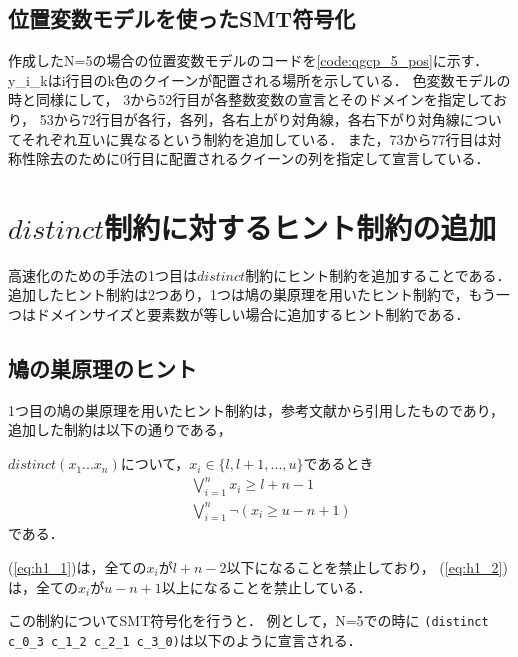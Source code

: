 \subsection{位置変数モデルを使ったSMT符号化}
作成したN=5の場合の位置変数モデルのコードを\ref{code:qgcp_5_pos}に示す．
y\_i\_kはi行目のk色のクイーンが配置される場所を示している．
色変数モデルの時と同様にして，
3から52行目が各整数変数の宣言とそのドメインを指定しており，
53から72行目が各行，各列，各右上がり対角線，各右下がり対角線についてそれぞれ互いに異なるという制約を追加している．
また，73から77行目は対称性除去のために0行目に配置されるクイーンの列を指定して宣言している．




%
%
\section{$distinct$制約に対するヒント制約の追加}\label{sec:hint}
高速化のための手法の1つ目は$distinct$制約にヒント制約を追加することである．
追加したヒント制約は2つあり，1つは鳩の巣原理を用いたヒント制約で，もう一つはドメインサイズと要素数が等しい場合に追加するヒント制約である．

\subsection{鳩の巣原理のヒント}
1つ目の鳩の巣原理を用いたヒント制約は，参考文献\cite{}から引用したものであり，追加した制約は以下の通りである，

$distinct(x_1 ... x_n)$について，$x_i \in \{l, l+1, ..., u\}$であるとき
\begin{eqnarray}
&& \bigvee_{i=1}^n   x_i \geq l+n-1\\
\label{eq:h1_1}
&& \bigvee_{i=1}^n \lnot(x_i \geq u-n+1)
\label{eq:h1_2}
\end{eqnarray}
である．

(\ref{eq:h1_1})は，全ての$x_i$が$l+n-2$以下になることを禁止しており，
(\ref{eq:h1_2})は，全ての$x_i$が$u-n+1$以上になることを禁止している．

この制約についてSMT符号化を行うと．
例として，N=5での時に
\verb|(distinct c_0_3 c_1_2 c_2_1 c_3_0)|は以下のように宣言される．

